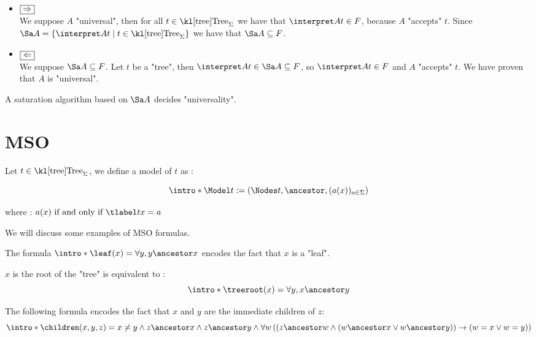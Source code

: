 \documentclass{article}
\begin{document}
\begin{proofI}
	\begin{itemize}
		\item $\fbox{$\Rightarrow$}$\\
		      We suppose $A$ "universal", then for all $t \in \tree_\Sigma$ we have that $\interpret A t \in F$, because $A$ "accepts" $t$.
		      Since $\Sa A = \setdef {\interpret A t} {t\in \tree_\Sigma}$ we have that $\Sa A \subseteq F$.

		\item $\fbox{$\Leftarrow$}$\\
		      We suppose $\Sa A \subseteq F$. Let $t$ be a "tree", then $\interpret A t \in \Sa A \subseteq F$, so $\interpret A t \in F$ and $A$
		      "accepts" $t$. We have proven that $A$ is "universal".
	\end{itemize}
\end{proofI}


\begin{coro}\label{coro:univeral-Sa}
	A saturation algorithm based on $\Sa A$ decides "universality".
\end{coro}


\section{MSO}

\begin{definition}
	Let $t \in \tree_{\Sigma}$, we define a model of $t$ as :

	\[\intro* \Model t := (\Nodes t, \ancestor , (a (x))_{a \in \Sigma}) \]

	where : $a(x) \tiff \tlabel t x = a$
\end{definition}

We will discuss some examples of MSO formulas.

\begin{example}
	The formula $\intro* \leaf (x) = \forall y,  y \ancestor x$ encodes the fact that $x$ is a "leaf".
\end{example}

\begin{example}
	$x$ is the root of the "tree" is equivalent to :
	\[\intro* \treeroot (x) = \forall y,  x \ancestor y \]
\end{example}

\begin{example}
	The following formula encodes the fact that $x$ and $y$ are the immediate children of $z$:
	\[\intro* \children (x,y,z) =
		x \neq y \land
		z  \ancestor  x \land  z \ancestor y \land
		\forall w
		\left( \left(
			z \ancestor w \land
				(w \ancestor x \lor w \ancestor  y) \right) \rightarrow (
			w = x \lor w = y
			)
		\right) \]
\end{example}
\end{document}
